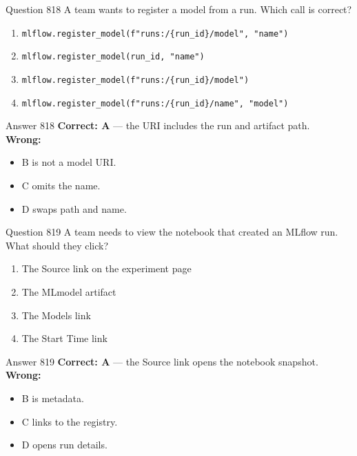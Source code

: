 \documentclass[aspectratio=169,11pt]{beamer}
\begin{document}
	\begin{frame}{Question 818}
		A team wants to register a model from a run. Which call is correct?
		\begin{enumerate}[label=\Alph*.]
			\item \texttt{mlflow.register\_model(f"runs:/\{run\_id\}/model", "name")}
			\item \texttt{mlflow.register\_model(run\_id, "name")}
			\item \texttt{mlflow.register\_model(f"runs:/\{run\_id\}/model")}
			\item \texttt{mlflow.register\_model(f"runs:/\{run\_id\}/name", "model")}
		\end{enumerate}
	\end{frame}
	\begin{frame}{Answer 818}
		\textbf{Correct: A} --- the URI includes the run and artifact path.\\
		\vspace{0.5em}
		\textbf{Wrong:}
		\begin{itemize}
			\item B is not a model URI.
			\item C omits the name.
			\item D swaps path and name.
		\end{itemize}
	\end{frame}
	
	\begin{frame}{Question 819}
		A team needs to view the notebook that created an MLflow run. What should they click?
		\begin{enumerate}[label=\Alph*.]
			\item The Source link on the experiment page
			\item The MLmodel artifact
			\item The Models link
			\item The Start Time link
		\end{enumerate}
	\end{frame}
	\begin{frame}{Answer 819}
		\textbf{Correct: A} --- the Source link opens the notebook snapshot.\\
		\vspace{0.5em}
		\textbf{Wrong:}
		\begin{itemize}
			\item B is metadata.
			\item C links to the registry.
			\item D opens run details.
		\end{itemize}
	\end{frame}
	
\end{document}
